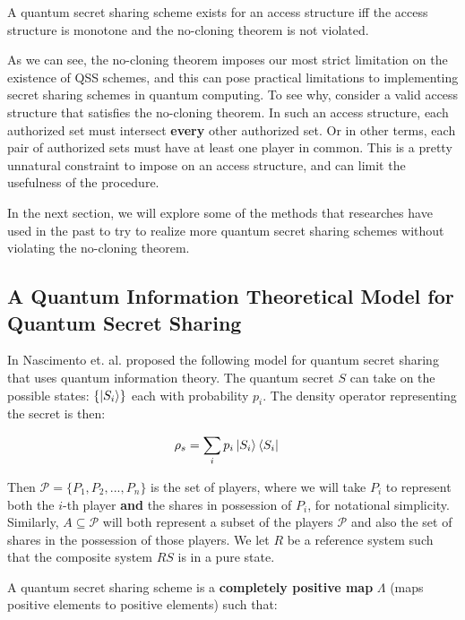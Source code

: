\begin{theorem}
    \label{thm:monotone-gamma}
    A quantum secret sharing scheme exists for an access structure iff the access structure is monotone and the no-cloning theorem is not violated.
\end{theorem}

As we can see, the no-cloning theorem imposes our most strict limitation on the existence of QSS schemes, and this can pose practical limitations to implementing secret sharing schemes in quantum computing. To see why, consider a valid access structure that satisfies the no-cloning theorem. In such an access structure, each authorized set must intersect \textbf{every} other authorized set. Or in other terms, each pair of authorized sets must have at least one player in common. This is a pretty unnatural constraint to impose on an access structure, and can limit the usefulness of the procedure.

In the next section, we will explore some of the methods that researches have used in the past to try to realize more quantum secret sharing schemes without violating the no-cloning theorem.

\subsection{A Quantum Information Theoretical Model for Quantum Secret Sharing}

In \cite{} Nascimento et. al. proposed the following model for quantum secret sharing that uses quantum information theory. The quantum secret $S$ can take on the possible states: $\{\ket{S_i}\}$ each with probability $p_i$. The density operator representing the secret is then:

\begin{align*}
    \rho_s &= \sum_i p_i \ket{S_i} \bra{S_i}
\end{align*}

Then $\mathcal{P} = \{P_1,P_2,...,P_n\}$ is the set of players, where we will take $P_i$ to represent both the $i$-th player \textbf{and} the shares in possession of $P_i$, for notational simplicity. Similarly, $A \subseteq \mathcal{P}$ will both represent a subset of the players $\mathcal{P}$ and also the set of shares in the possession of those players. We let $R$ be a reference system such that the composite system $RS$ is in a pure state.

A quantum secret sharing scheme is a \textbf{completely positive map} $\Lambda$ (maps positive elements to positive elements) such that:

